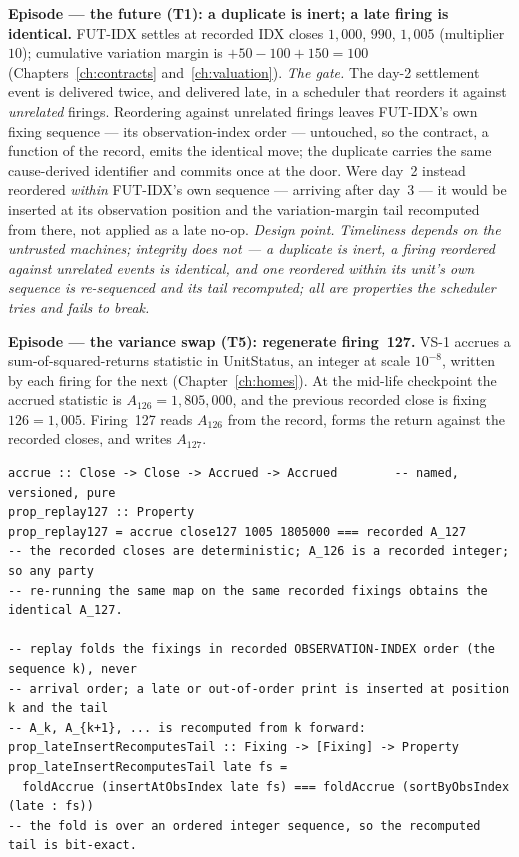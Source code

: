 \medskip\noindent\textbf{Episode --- the future (T1): a duplicate is inert; a late firing is
identical.}
FUT-IDX settles at recorded IDX closes $1{,}000$, $990$, $1{,}005$ (multiplier $10$);
cumulative variation margin is $+50-100+150 = 100$ (Chapters~\ref{ch:contracts}
and~\ref{ch:valuation}). \emph{The gate.} The day-2 settlement event is delivered twice, and
delivered late, in a scheduler that reorders it against \emph{unrelated} firings. Reordering
against unrelated firings leaves FUT-IDX's own fixing sequence --- its observation-index
order --- untouched, so the contract, a function of the record, emits the identical
 move; the duplicate carries the same cause-derived identifier and commits once at
the door. Were day~2 instead reordered \emph{within} FUT-IDX's own sequence --- arriving
after day~3 --- it would be inserted at its observation position and the variation-margin
tail recomputed from there, not applied as a late no-op. \emph{Design point.}
\emph{Timeliness depends on the untrusted machines; integrity does not --- a duplicate is
inert, a firing reordered against unrelated events is identical, and one reordered within
its unit's own sequence is re-sequenced and its tail recomputed; all are properties the
scheduler tries and fails to break.}

\medskip\noindent\textbf{Episode --- the variance swap (T5): regenerate firing~127.}
VS-1 accrues a sum-of-squared-returns statistic in UnitStatus, an integer at scale $10^{-8}$,
written by each firing for the next (Chapter~\ref{ch:homes}). At the mid-life checkpoint the
accrued statistic is $A_{126} = 1{,}805{,}000$, and the previous recorded close is fixing
$126 = 1{,}005$. Firing~127 reads $A_{126}$ from the record, forms the return against the
recorded closes, and writes $A_{127}$.

\begin{lstlisting}
accrue :: Close -> Close -> Accrued -> Accrued        -- named, versioned, pure
prop_replay127 :: Property
prop_replay127 = accrue close127 1005 1805000 === recorded A_127
-- the recorded closes are deterministic; A_126 is a recorded integer; so any party
-- re-running the same map on the same recorded fixings obtains the identical A_127.

-- replay folds the fixings in recorded OBSERVATION-INDEX order (the sequence k), never
-- arrival order; a late or out-of-order print is inserted at position k and the tail
-- A_k, A_{k+1}, ... is recomputed from k forward:
prop_lateInsertRecomputesTail :: Fixing -> [Fixing] -> Property
prop_lateInsertRecomputesTail late fs =
  foldAccrue (insertAtObsIndex late fs) === foldAccrue (sortByObsIndex (late : fs))
-- the fold is over an ordered integer sequence, so the recomputed tail is bit-exact.
\end{lstlisting}

